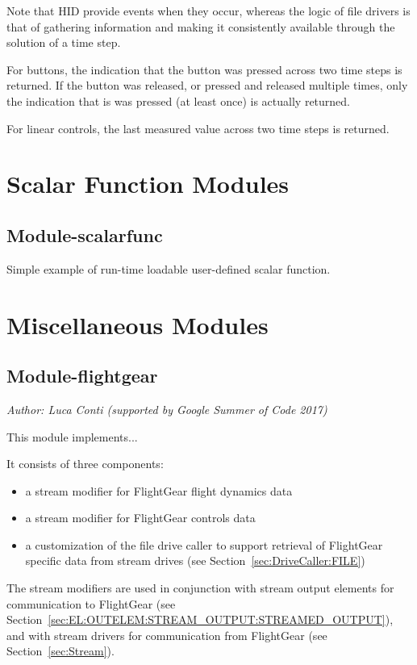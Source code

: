 Note that HID provide events when they occur, whereas the logic of file drivers
is that of gathering information and making it consistently available through
the solution of a time step.

For buttons, the indication that the button was pressed across two time steps is returned.
If the button was released, or pressed and released multiple times,
only the indication that is was pressed (at least once) is actually returned.

For linear controls, the last measured value across two time steps is returned.





\section{Scalar Function Modules}

\subsection{Module-scalarfunc}
Simple example of run-time loadable user-defined scalar function.



\section{Miscellaneous Modules}

\subsection{Module-flightgear}
\emph{Author: Luca Conti (supported by Google Summer of Code 2017)}

\bigskip

\noindent
This module implements...

It consists of three components:
\begin{itemize}
\item a stream modifier for FlightGear flight dynamics data
\item a stream modifier for FlightGear controls data
\item a customization of the file drive caller to support retrieval of FlightGear specific data
from stream drives (see Section~\ref{sec:DriveCaller:FILE})
\end{itemize}
The stream modifiers are used in conjunction with stream output elements for communication to FlightGear
(see Section~\ref{sec:EL:OUTELEM:STREAM_OUTPUT:STREAMED_OUTPUT}),
and with stream drivers for communication from FlightGear
(see Section~\ref{sec:Stream}).

